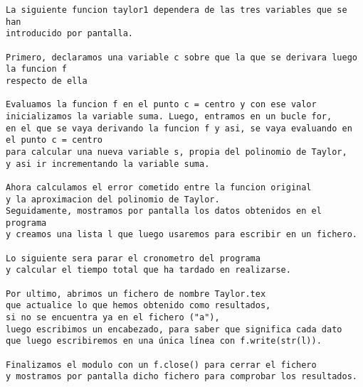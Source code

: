 \begin{center}
\begin{footnotesize}
\begin{verbatim}
La siguiente funcion taylor1 dependera de las tres variables que se han 
introducido por pantalla.

Primero, declaramos una variable c sobre que la que se derivara luego la funcion f 
respecto de ella

Evaluamos la funcion f en el punto c = centro y con ese valor 
inicializamos la variable suma. Luego, entramos en un bucle for, 
en el que se vaya derivando la funcion f y asi, se vaya evaluando en el punto c = centro
para calcular una nueva variable s, propia del polinomio de Taylor,
y asi ir incrementando la variable suma.
 
Ahora calculamos el error cometido entre la funcion original 
y la aproximacion del polinomio de Taylor. 
Seguidamente, mostramos por pantalla los datos obtenidos en el programa 
y creamos una lista l que luego usaremos para escribir en un fichero.
 
Lo siguiente sera parar el cronometro del programa 
y calcular el tiempo total que ha tardado en realizarse.
 
Por ultimo, abrimos un fichero de nombre Taylor.tex 
que actualice lo que hemos obtenido como resultados, 
si no se encuentra ya en el fichero ("a"), 
luego escribimos un encabezado, para saber que significa cada dato 
que luego escribiremos en una única línea con f.write(str(l)).
 
Finalizamos el modulo con un f.close() para cerrar el fichero 
y mostramos por pantalla dicho fichero para comprobar los resultados.
 
\end{verbatim}
\end{footnotesize}
\end{center}

